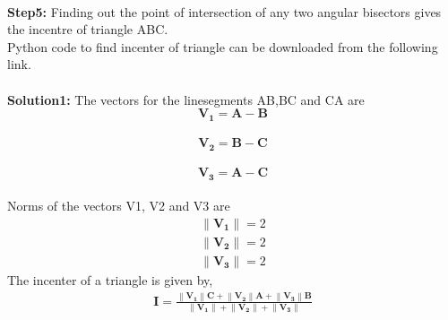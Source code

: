 \documentclass[10pt,a4paper]{report}
\providecommand{\norm}[1]{\left\lVert#1\right\rVert}
\let\vec\mathbf
\begin{document}
\begin{multicols}{2}
\newline
\\
\textbf{Step5:} Finding out the point of intersection of any two angular bisectors gives the incentre of triangle ABC.
\newline
\\
Python code to find incenter of triangle can be downloaded from the following link.
\\
\vspace{2mm} 
\\
\vspace{2mm}
\textbf{Solution1:}
The vectors for the linesegments AB,BC and CA  are   \\
\begin{equation}
\vec{V_1} = \vec{A}-\vec{B}
\end{equation}\\
\begin{equation}
\vec{V_2} = \vec{B}-\vec{C}
\end{equation}\\
\begin{equation}
\vec{V_3} = \vec{A}-\vec{C}
\end{equation} \\
\vspace{2mm}
\hspace{1cm} Norms of the vectors V1, V2 and V3 are 
\begin{align}
\norm{\vec{V_1}}=2
\end{align}
\begin{align}
\norm{\vec{V_2}}=2
\end{align}
\begin{align}
\norm{\vec{V_3}}=2
\end{align}
\hspace{1.6cm} The incenter of a triangle is given by,
\begin{align}
\boxed{\vec{I}=\frac{\norm{\vec{V_1}}{\vec{C}}+\norm{\vec{V_2}}{\vec{A}}+\norm{\vec{V_3}}{\vec{B}}}{\norm{\vec{V_1}}+\norm{\vec{V_2}}+\norm{\vec{V_3}}}}
\end{align}

\end{multicols}
\end{document}
